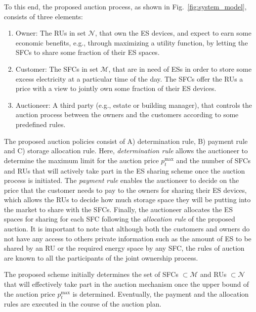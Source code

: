 \documentclass[journal,10pt]{IEEEtran}
\begin{document}
To this end, the proposed auction process, as shown in Fig.~\ref{fig:system_model}, consists of three elements:
\begin{enumerate}
\item Owner: The RUs in set $\mathcal{N}$, that own the ES devices, and expect to earn some economic benefits, e.g., through maximizing a utility function, by letting the SFCs to share some fraction of their ES spaces.
\item Customer: The SFCs in set $\mathcal{M}$, that are in need of ESs in order to store some excess electricity at a particular time of the day. The SFCs offer the RUs a price with a view to jointly own some fraction of their ES devices.
\item Auctioneer: A third party (e.g., estate or building manager), that controls the auction process between the owners and the customers according to some predefined rules.
\end{enumerate}
The proposed auction policies consist of A) determination rule, B) payment rule and C) storage allocation rule. Here, \emph{determination rule} allows the auctioneer to determine the maximum limit for the auction price $p_t^\text{max}$ and the number of SFCs and RUs that will actively take part in the ES sharing scheme once the auction process is initiated. The \emph{payment rule} enables the auctioneer to decide on the price that the customer needs to pay to the owners for sharing their ES devices, which allows the RUs to decide how much storage space they will be putting into the market to share with the SFCs. Finally, the auctioneer allocates the ES spaces for sharing for each SFC following the \emph{allocation rule} of the proposed auction. It is important to note that although both the customers and owners do not have any access to others private information such as the amount of ES to be shared by an RU or the required energy space by any SFC, the rules of auction are known to all the participants of the joint ownership process.

The proposed scheme initially determines the set of SFCs $\subset\mathcal{M}$ and RUs $\subset\mathcal{N}$ that will effectively take part in the auction mechanism once the upper bound of the auction price $p_t^\text{max}$ is determined. Eventually, the payment and the allocation rules are executed in the course of the auction plan.
\end{document}
